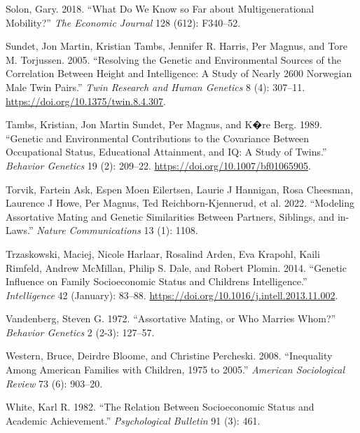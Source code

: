 \documentclass[
  12pt,
]{article}
\newlength{\cslhangindent}
\newlength{\cslentryspacingunit} %
\newenvironment{CSLReferences}[2] %
 {%
  \setlength{\parindent}{0pt}
  \ifodd #1
  \let\oldpar\par
  \def\par{\hangindent=\cslhangindent\oldpar}
  \fi
  \setlength{\parskip}{#2\cslentryspacingunit}
 }%
 {}
\theoremstyle{definition}
\theoremstyle{definition}
\theoremstyle{definition}
\theoremstyle{definition}
\theoremstyle{remark}
\begin{document}
\begin{CSLReferences}{1}{0}
\leavevmode{}%
Solon, Gary. 2018. {``What Do We Know so Far about Multigenerational Mobility?''} \emph{The Economic Journal} 128 (612): F340--52.

\leavevmode{}%
Sundet, Jon Martin, Kristian Tambs, Jennifer R. Harris, Per Magnus, and Tore M. Torjussen. 2005. {``Resolving the Genetic and Environmental Sources of the Correlation Between Height and Intelligence: A Study of Nearly 2600 Norwegian Male Twin Pairs.''} \emph{Twin Research and Human Genetics} 8 (4): 307--11. \url{https://doi.org/10.1375/twin.8.4.307}.

\leavevmode{}%
Tambs, Kristian, Jon Martin Sundet, Per Magnus, and K�re Berg. 1989. {``Genetic and Environmental Contributions to the Covariance Between Occupational Status, Educational Attainment, and {IQ}: A Study of Twins.''} \emph{Behavior Genetics} 19 (2): 209--22. \url{https://doi.org/10.1007/bf01065905}.

\leavevmode{}%
Torvik, Fartein Ask, Espen Moen Eilertsen, Laurie J Hannigan, Rosa Cheesman, Laurence J Howe, Per Magnus, Ted Reichborn-Kjennerud, et al. 2022. {``Modeling Assortative Mating and Genetic Similarities Between Partners, Siblings, and in-Laws.''} \emph{Nature Communications} 13 (1): 1108.

\leavevmode{}%
Trzaskowski, Maciej, Nicole Harlaar, Rosalind Arden, Eva Krapohl, Kaili Rimfeld, Andrew McMillan, Philip S. Dale, and Robert Plomin. 2014. {``Genetic Influence on Family Socioeconomic Status and Children{\textquotesingle}s Intelligence.''} \emph{Intelligence} 42 (January): 83--88. \url{https://doi.org/10.1016/j.intell.2013.11.002}.

\leavevmode{}%
Vandenberg, Steven G. 1972. {``Assortative Mating, or Who Marries Whom?''} \emph{Behavior Genetics} 2 (2-3): 127--57.

\leavevmode{}%
Western, Bruce, Deirdre Bloome, and Christine Percheski. 2008. {``Inequality Among American Families with Children, 1975 to 2005.''} \emph{American Sociological Review} 73 (6): 903--20.

\leavevmode{}%
White, Karl R. 1982. {``The Relation Between Socioeconomic Status and Academic Achievement.''} \emph{Psychological Bulletin} 91 (3): 461.


\end{CSLReferences}
\end{document}
